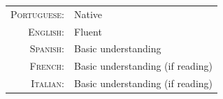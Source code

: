 \documentclass[letter,10pt]{article} %
\begin{document}
\begin{tabular}{rl}
	\textsc{Portuguese:} & Native\\

	\textsc{English:} & Fluent\\

	\textsc{Spanish:} & Basic understanding\\

	\textsc{French:} & Basic understanding (if reading)\\

	\textsc{Italian:} & Basic understanding (if reading)\\
\end{tabular} \\

\end{document}
